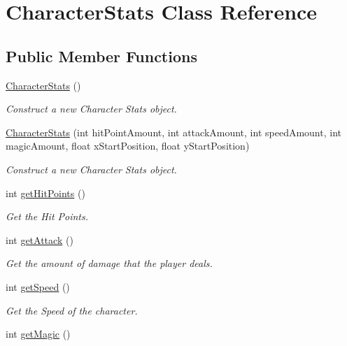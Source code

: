 \hypertarget{classCharacterStats}{}\section{Character\+Stats Class Reference}
\label{classCharacterStats}
\subsection*{Public Member Functions}
\begin{DoxyCompactItemize}
\item 
\mbox{\hyperlink{classCharacterStats_a74e13afe074c52cad1c27ea426264540}{Character\+Stats}} ()
\begin{DoxyCompactList}\small\item\em Construct a new Character Stats object. \end{DoxyCompactList}\item 
\mbox{\hyperlink{classCharacterStats_a4bb12395ec8f7eb816309e6229454e11}{Character\+Stats}} (int hit\+Point\+Amount, int attack\+Amount, int speed\+Amount, int magic\+Amount, float x\+Start\+Position, float y\+Start\+Position)
\begin{DoxyCompactList}\small\item\em Construct a new Character Stats object. \end{DoxyCompactList}\item 
int \mbox{\hyperlink{classCharacterStats_a9b22b4a1fcafe1a16f3883547eb5d9bc}{get\+Hit\+Points}} ()
\begin{DoxyCompactList}\small\item\em Get the Hit Points. \end{DoxyCompactList}\item 
int \mbox{\hyperlink{classCharacterStats_afd13f0b95ad65a9ab7b944da61876fc1}{get\+Attack}} ()
\begin{DoxyCompactList}\small\item\em Get the amount of damage that the player deals. \end{DoxyCompactList}\item 
int \mbox{\hyperlink{classCharacterStats_af7dcfe803978f4a84ea87f881d857c58}{get\+Speed}} ()
\begin{DoxyCompactList}\small\item\em Get the Speed of the character. \end{DoxyCompactList}\item 
int \mbox{\hyperlink{classCharacterStats_a96f79ff2af072daba294d8e04f9d29a4}{get\+Magic}} ()

\end{DoxyCompactItemize}
